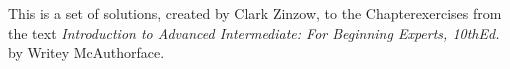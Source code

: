 \documentclass[twoside, titlepage]{amsart}
\makeatletter
\newcommand{\authorName}{Clark Zinzow}  %
\newcommand{\bookName}{Introduction to Advanced Intermediate: For Beginning Experts}  %
\newcommand{\bookEdition}{10th}
\newcommand{\sectionType}{Chapter} %
\newcommand{\sectionNumber}{1} %
\newcommand{\startDate}{\today}
\newcommand{\bookAuthor}{Writey McAuthorface}  %
\newcommand{\universityName}{University of Wisconsin-Madison}
\newcommand{\authorEmail}{czinzow@wisc.edu}  %
\theoremstyle{plain} %
\theoremstyle{definition}
\theoremstyle{remark}
\theoremstyle{notation}
\makeatother
\begin{document}
	
	\makeatletter
	\providecommand\@dotsep{5}
	\makeatother
	\listoftodos\relax
	
	\clearpage
	
	This is a set of solutions, created by \authorName, to the \sectionType \:\sectionNumber \:exercises from the text \emph{\bookName, \bookEdition \:Ed.} by \bookAuthor.
	\hspace{0pt} \\
	
\end{document}
